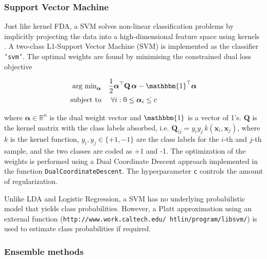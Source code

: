 \documentclass[utf8]{frontiersSCNS} %
\newcommand{\al}{\boldsymbol{\alpha}}
\newcommand{\x}{\mathbf{x}}
\newcommand{\Q}{\mathbf{Q}}
\newcommand{\R}{\mathbb{R}}
\newcommand{\ttt}[1]{\texttt{#1}}
\begin{document}
\subsubsection{Support Vector Machine}

Just like kernel FDA, a SVM solves non-linear classification problems by implicitly projecting the data into a high-dimensional feature space using kernels \citep{Bishop2007}.
A two-class L1-Support Vector Machine (SVM) is implemented as the classifier \ttt{'svm'}.
The optimal weights are found by minimising the constrained dual loss objective

\begin{align}
\begin{split}
\label{eq:svm_dual_loss_function}
\text{arg min}_{\al}\quad
& \frac{1}{2} \al^\top\Q\,\al - \mathbbm{1}^\top\al\\
\text{subject to}\quad  &\ \forall i: 0 \le \al_i \le c
\end{split}
\end{align}

where $\al\in\R^n$ is the dual weight vector and  $\mathbbm{1}$ is a vector of 1's. $\Q$ is the kernel matrix with the class labels absorbed, i.e. $\Q_{ij} = y_i y_j\, k(\x_i,\x_j)$, where $k$ is the kernel function, $y_i, y_j \in\{+1, -1\}$ are the class labels for the $i$-th and $j$-th sample, and the two classes are coded as +1 and -1. The optimization of the weights is performed using a Dual Coordinate Descent
approach  \citep{Hsieh2008ASVM} implemented in the function \ttt{DualCoordinateDescent}. The hyperparameter  \ttt{c} controls the amount of regularization.


Unlike LDA and Logistic Regression, a SVM has no underlying probabilistic model that yields class probabilities. However, a Platt approximation using an external function (\ttt{http://www.work.caltech.edu/~htlin/program/libsvm/}) is used to estimate class probabilities if required.


\subsubsection{Ensemble methods}
\end{document}
